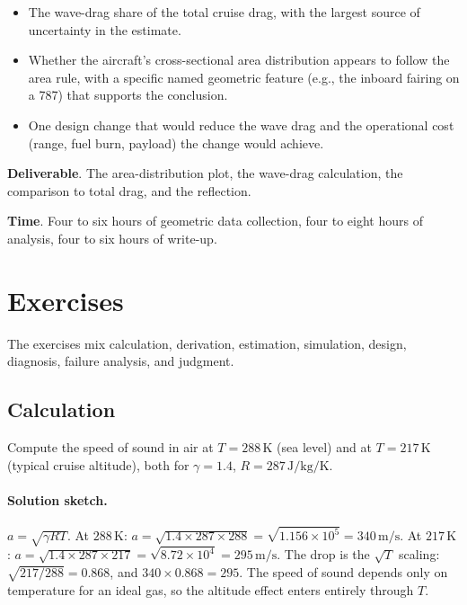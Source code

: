 \begin{project}
\begin{itemize}[leftmargin=*]
  \item The wave-drag share of the total cruise drag, with the
    largest source of uncertainty in the estimate.
  \item Whether the aircraft's cross-sectional area distribution
    appears to follow the area rule, with a specific named
    geometric feature (e.g., the inboard fairing on a 787) that
    supports the conclusion.
  \item One design change that would reduce the wave drag and the
    operational cost (range, fuel burn, payload) the change would
    achieve.
\end{itemize}

\textbf{Deliverable}. The area-distribution plot, the wave-drag
calculation, the comparison to total drag, and the reflection.

\textbf{Time}. Four to six hours of geometric data collection,
four to eight hours of analysis, four to six hours of write-up.
\end{project}

\section{Exercises}

The exercises mix calculation, derivation, estimation, simulation,
design, diagnosis, failure analysis, and judgment.

\subsection*{Calculation}

\begin{exercise}
Compute the speed of sound in air at $T = 288\,\si{\kelvin}$ (sea
level) and at $T = 217\,\si{\kelvin}$ (typical cruise altitude),
both for $\gamma = 1.4$, $R = 287\,\si{\joule\per\kilogram\per
\kelvin}$.
\paragraph{Solution sketch.} $a = \sqrt{\gamma R T}$. At
$288\,\si{\kelvin}$: $a = \sqrt{1.4\times 287\times 288} =
\sqrt{1.156\times 10^{5}} = 340\,\si{\meter\per\second}$. At
$217\,\si{\kelvin}$: $a = \sqrt{1.4\times 287\times 217} =
\sqrt{8.72\times 10^{4}} = 295\,\si{\meter\per\second}$. The drop is
the $\sqrt{T}$ scaling: $\sqrt{217/288} = 0.868$, and $340\times
0.868 = 295$. The speed of sound depends only on temperature for an
ideal gas, so the altitude effect enters entirely through $T$.
\end{exercise}

